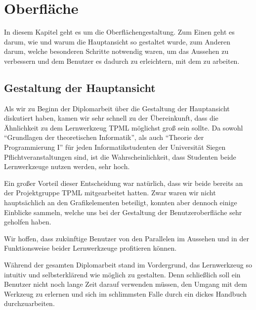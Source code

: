 



\chapter{Oberfläche}\label{GUI}

In diesem Kapitel geht es um die Oberflächengestaltung. Zum Einen geht es darum,
wie und warum die Hauptansicht so gestaltet wurde, zum Anderen darum, welche
besonderen Schritte notwendig waren, um das Aussehen zu verbessern und dem
Benutzer es dadurch zu erleichtern, mit dem \gtitool zu arbeiten.
\vspace{10pt}


\section{Gestaltung der Hauptansicht}\label{GUIMain}

Als wir zu Beginn der Diplomarbeit über die Gestaltung der Hauptansicht
diskutiert haben, kamen wir sehr schnell zu der Übereinkunft, dass die
Ähnlichkeit zu dem Lernwerkzeug TPML möglichst groß sein sollte. Da sowohl
"`Grundlagen der theoretischen Informatik"', als auch "`Theorie der
Programmierung I"' für jeden Informatikstudenten der Universität Siegen
Pflichtveranstaltungen sind, ist die Wahrscheinlichkeit, dass Studenten beide
Lernwerkzeuge nutzen werden, sehr hoch.\vspace{10pt}

Ein großer Vorteil dieser Entscheidung war natürlich, dass wir beide
bereits an der Projektgruppe TPML mitgearbeitet hatten. Zwar waren wir nicht
hauptsächlich an den Grafikelementen beteiligt, konnten aber dennoch einige
Einblicke sammeln, welche uns bei der Gestaltung der Benutzeroberfläche sehr
geholfen haben.\vspace{10pt}

Wir hoffen, dass zukünftige Benutzer von den Parallelen im Aussehen
und in der Funktionsweise beider Lernwerkzeuge profitieren können.\vspace{10pt}

Während der gesamten Diplomarbeit stand im Vordergrund, das Lernwerkzeug so
intuitiv und selbsterklärend wie möglich zu gestalten. Denn schließlich soll
ein Benutzer nicht noch lange Zeit darauf verwenden müssen, den Umgang mit dem
Werkzeug zu erlernen und sich im schlimmsten Falle durch ein dickes Handbuch
durchzuarbeiten.\vspace{10pt}

